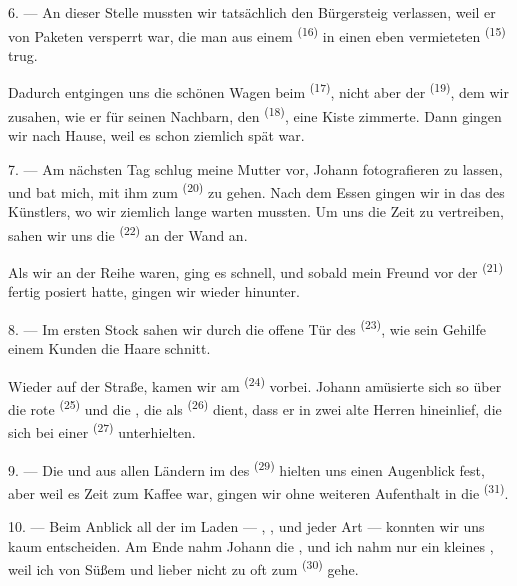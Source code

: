 6. --- An dieser Stelle mussten wir tatsächlich den Bürgersteig verlassen, weil er
von Paketen versperrt war, die man aus einem 
\textsuperscript{(16)} in einen eben vermieteten 
\textsuperscript{(15)} trug.

Dadurch entgingen uns die schönen Wagen beim 
\textsuperscript{(17)}, nicht aber der  \textsuperscript{(19)}, dem wir
zusahen, wie er für seinen Nachbarn, den 
\textsuperscript{(18)}, eine Kiste zimmerte. Dann gingen wir nach Hause, weil es schon
ziemlich spät war.

\VUsaut{3.0mm}

7. --- Am nächsten Tag schlug meine Mutter vor, Johann fotografieren zu lassen, und
bat mich, mit ihm zum  \textsuperscript{(20)} zu gehen. Nach dem
Essen gingen wir in das  des Künstlers, wo wir ziemlich lange warten
mussten. Um uns die Zeit zu vertreiben, sahen wir uns die 
\textsuperscript{(22)} an der Wand an.

Als wir an der Reihe waren, ging es schnell, und sobald mein Freund vor der
 \textsuperscript{(21)} fertig posiert hatte, gingen wir wieder
hinunter.

8. --- Im ersten Stock sahen wir durch die offene Tür des 
\textsuperscript{(23)}, wie sein Gehilfe einem Kunden die Haare schnitt.

Wieder auf der Straße, kamen wir am  \textsuperscript{(24)}
vorbei. Johann amüsierte sich so über die rote 
\textsuperscript{(25)} und die , die als 
\textsuperscript{(26)} dient, dass er in zwei alte Herren hineinlief, die sich bei
einer  \textsuperscript{(27)} unterhielten.

\VUsaut{3.0mm}

9. --- Die  und  aus allen Ländern im
 des  \textsuperscript{(29)} hielten uns
einen Augenblick fest, aber weil es Zeit zum Kaffee war, gingen wir ohne weiteren
Aufenthalt in die  \textsuperscript{(31)}.

10. --- Beim Anblick all der  im Laden --- ,
,  und  jeder Art --- konnten
wir uns kaum entscheiden. Am Ende nahm Johann die , und ich
nahm nur ein kleines , weil ich von Süßem
 und lieber nicht zu oft zum 
\textsuperscript{(30)} gehe.

